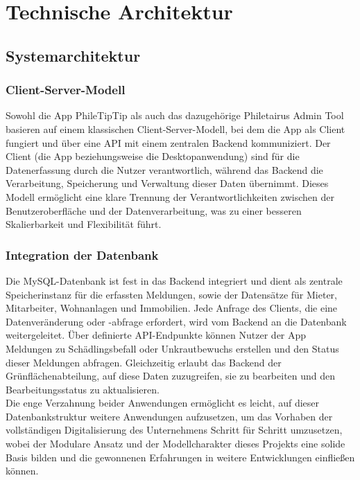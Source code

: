 \section{Technische Architektur}



\subsection{Systemarchitektur}

\subsubsection{Client-Server-Modell}

Sowohl die App PhileTipTip als auch das dazugehörige Philetairus Admin Tool basieren auf einem klassischen Client-Server-Modell, bei dem die App als Client fungiert und über eine API mit einem zentralen Backend kommuniziert. Der Client (die App beziehungsweise die Desktopanwendung) sind für die Datenerfassung durch die Nutzer verantwortlich, während das Backend die Verarbeitung, Speicherung und Verwaltung dieser Daten übernimmt. Dieses Modell ermöglicht eine klare Trennung der Verantwortlichkeiten zwischen der Benutzeroberfläche und der Datenverarbeitung, was zu einer besseren Skalierbarkeit und Flexibilität führt.

\subsubsection{Integration der Datenbank}

Die MySQL-Datenbank ist fest in das Backend integriert und dient als zentrale Speicherinstanz für die erfassten Meldungen, sowie der Datensätze für Mieter, Mitarbeiter, Wohnanlagen und Immobilien. Jede Anfrage des Clients, die eine Datenveränderung oder -abfrage erfordert, wird vom Backend an die Datenbank weitergeleitet. Über definierte API-Endpunkte können Nutzer der App Meldungen zu Schädlingsbefall oder Unkrautbewuchs erstellen und den Status dieser Meldungen abfragen. Gleichzeitig erlaubt das Backend der Grünflächenabteilung, auf diese Daten zuzugreifen, sie zu bearbeiten und den Bearbeitungsstatus zu aktualisieren.\\

Die enge Verzahnung beider Anwendungen ermöglicht es leicht, auf dieser Datenbankstruktur weitere Anwendungen aufzusetzen, um das Vorhaben der vollständigen Digitalisierung des Unternehmens Schritt für Schritt umzusetzen, wobei der Modulare Ansatz und der Modellcharakter dieses Projekts eine solide Basis bilden und die gewonnenen Erfahrungen in weitere Entwicklungen einfließen können.\\

